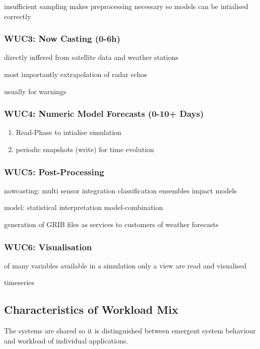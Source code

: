\documentclass{../../template/esiwace-report}
\begin{document}
insufficient sampling makes preprocessing necessary so models can be intialised correctly


\subsubsection{WUC3: Now Casting (0-6h)}

directly inffered from satellite data and weather stations

most importantly extrapolation of radar echos

usually for warnings




\subsubsection{WUC4: Numeric Model Forecasts (0-10+ Days)}

\begin{enumerate}
	\item Read-Phase to intialise simulation
	\item periodic snapshots (write) for time evolution
\end{enumerate}


\subsubsection{WUC5: Post-Processing}

nowcasting:
multi sensor integration
classification
ensembles
impact models

model:
statistical interpretation
model-combination



generation of GRIB files as services to customers of weather forecasts


\subsubsection{WUC6: Visualisation}

of many variables available in a simulation only a view are read and visualised

timeseries




\subsection{Characteristics of Workload Mix}

The systems are shared so it is distinguished between emergent system behaviour and workload of individual applications.
\end{document}

